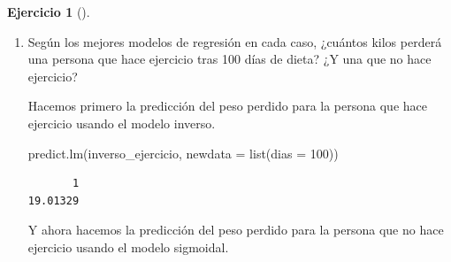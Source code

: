 \documentclass[
  a4paper,
]{scrreport}
\newenvironment{Shaded}{\begin{snugshade}}{\end{snugshade}}
\newcommand{\AttributeTok}[1]{\textcolor[rgb]{0.40,0.45,0.13}{#1}}
\newcommand{\DecValTok}[1]{\textcolor[rgb]{0.68,0.00,0.00}{#1}}
\newcommand{\FunctionTok}[1]{\textcolor[rgb]{0.28,0.35,0.67}{#1}}
\newcommand{\NormalTok}[1]{\textcolor[rgb]{0.00,0.23,0.31}{#1}}
\theoremstyle{definition}
\newtheorem{exercise}{Ejercicio}[chapter]
\theoremstyle{remark}
\begin{document}
\begin{exercise}[]
\begin{enumerate}
\begin{tcolorbox}
\begin{verbatim}

Call:
lm(formula = log(peso.perdido) ~ I(1/dias), data = df[df$ejercicio == 
    "no", ])

Residuals:
     Min       1Q   Median       3Q      Max 
-0.66026 -0.07192  0.04678  0.13142  0.29633 

Coefficients:
            Estimate Std. Error t value Pr(>|t|)    
(Intercept)   2.8694     0.1021   28.09 2.55e-16 ***
I(1/dias)   -24.4226     3.4111   -7.16 1.15e-06 ***
---
Signif. codes:  0 '***' 0.001 '**' 0.01 '*' 0.05 '.' 0.1 ' ' 1

Residual standard error: 0.2417 on 18 degrees of freedom
Multiple R-squared:  0.7401,    Adjusted R-squared:  0.7257 
F-statistic: 51.26 on 1 and 18 DF,  p-value: 1.146e-06
\end{verbatim}

  \end{tcolorbox}
\item
  Según los mejores modelos de regresión en cada caso, ¿cuántos kilos
  perderá una persona que hace ejercicio tras 100 días de dieta? ¿Y una
  que no hace ejercicio?

  \begin{tcolorbox}[enhanced jigsaw, breakable, opacityback=0, colbacktitle=quarto-callout-tip-color!10!white, colframe=quarto-callout-tip-color-frame, left=2mm, titlerule=0mm, coltitle=black, colback=white, bottomtitle=1mm, toptitle=1mm, opacitybacktitle=0.6, title=\textcolor{quarto-callout-tip-color}{\faLightbulb}\hspace{0.5em}{Solución}, leftrule=.75mm, bottomrule=.15mm, toprule=.15mm, rightrule=.15mm, arc=.35mm]

  Hacemos primero la predicción del peso perdido para la persona que
  hace ejercicio usando el modelo inverso.

\begin{Shaded}
\begin{Highlighting}[]
\FunctionTok{predict.lm}\NormalTok{(inverso\_ejercicio, }\AttributeTok{newdata =} \FunctionTok{list}\NormalTok{(}\AttributeTok{dias =} \DecValTok{100}\NormalTok{))}
\end{Highlighting}
\end{Shaded}

\begin{verbatim}
       1 
19.01329 
\end{verbatim}

  Y ahora hacemos la predicción del peso perdido para la persona que no
  hace ejercicio usando el modelo sigmoidal.


\end{tcolorbox}
\end{enumerate}
\end{exercise}
\end{document}
